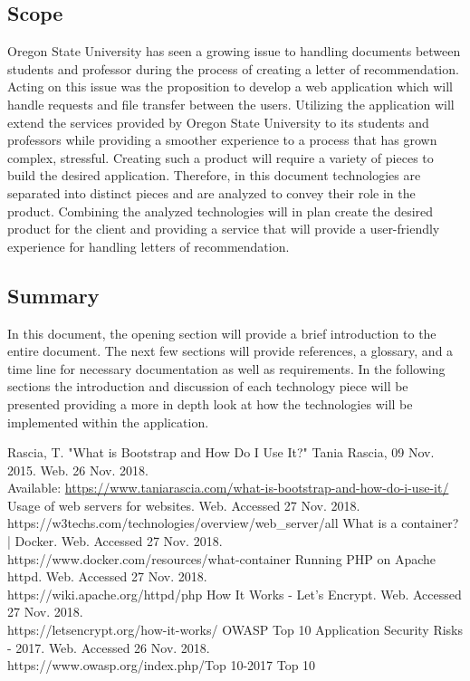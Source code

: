 \documentclass[onecolumn, draftclsnofoot,10pt, compsoc]{IEEEtran}
\begin{document}
\subsection{Scope}
Oregon State University has seen a growing issue to handling documents between students and professor during the process of creating a letter of recommendation. Acting on this issue was the proposition to develop a web application which will handle requests and file transfer between the users. Utilizing the application will extend the services provided by Oregon State University to its students and professors while providing a smoother experience to a process that has grown complex, stressful. Creating such a product will require a variety of pieces to build the desired application. Therefore, in this document technologies are separated into distinct pieces and are analyzed to convey their role in the product. Combining the analyzed technologies will in plan create the desired product for the client and providing a service that will provide a user-friendly experience for handling letters of recommendation. 

\subsection{Summary}
In this document, the opening section will provide a brief introduction to the entire document. The next few sections will provide references, a glossary, and a time line for necessary documentation as well as requirements. In the following sections the introduction and discussion of each technology piece will be presented providing a more in depth look at how the technologies will be implemented within the application.

\begin{thebibliography}{IEEEtran}
Rascia, T. "What is Bootstrap and How Do I Use It?" Tania Rascia, 09 Nov. 2015. Web. 26 Nov. 2018. \\
Available: \url{https://www.taniarascia.com/what-is-bootstrap-and-how-do-i-use-it/}
Usage of web servers for websites. Web. Accessed 27 Nov. 2018.\\
https://w3techs.com/technologies/overview/web\_server/all
What is a container? | Docker. Web. Accessed 27 Nov. 2018.\\
https://www.docker.com/resources/what-container
Running PHP on Apache httpd. Web. Accessed 27 Nov. 2018.\\
https://wiki.apache.org/httpd/php
How It Works - Let's Encrypt. Web. Accessed 27 Nov. 2018.\\
https://letsencrypt.org/how-it-works/
OWASP Top 10 Application Security Risks - 2017. Web. Accessed 26 Nov. 2018.\\
https://www.owasp.org/index.php/Top 10-2017 Top 10
\end{thebibliography}
\end{document}
